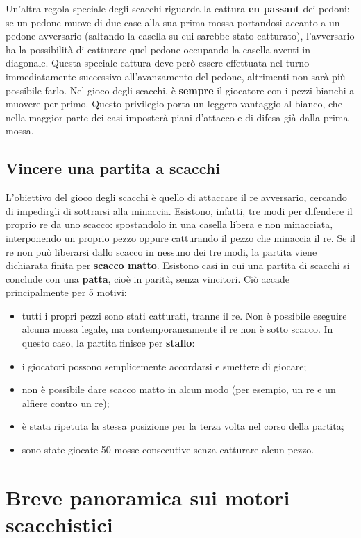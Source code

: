 Un'altra regola speciale degli scacchi riguarda la cattura \textbf{en passant} dei pedoni: se un pedone muove di due case alla sua prima mossa portandosi accanto a un pedone avversario (saltando la casella su cui sarebbe stato catturato), l'avversario ha la possibilità di catturare quel pedone occupando la casella aventi in diagonale. Questa speciale cattura deve però essere effettuata nel turno immediatamente successivo all'avanzamento del pedone, altrimenti non sarà più possibile farlo.
Nel gioco degli scacchi, è \textbf{sempre} il giocatore con i pezzi bianchi a muovere per primo. Questo privilegio porta un leggero vantaggio al bianco, che nella maggior parte dei casi imposterà piani d'attacco e di difesa già dalla prima mossa.

\subsection{Vincere una partita a scacchi}
L'obiettivo del gioco degli scacchi è quello di attaccare il re avversario, cercando di impedirgli di sottrarsi alla minaccia. Esistono, infatti, tre modi per difendere il proprio re da uno scacco: spostandolo in una casella libera e non minacciata, interponendo un proprio pezzo oppure catturando il pezzo che minaccia il re. Se il re non può liberarsi dallo scacco in nessuno dei tre modi, la partita viene dichiarata finita per \textbf{scacco matto}. Esistono casi in cui una partita di scacchi si conclude con una \textbf{patta}, cioè in parità, senza vincitori. Ciò accade principalmente per 5 motivi:
\begin{itemize}
    \item tutti i propri pezzi sono stati catturati, tranne il re. Non è possibile eseguire alcuna mossa legale, ma contemporaneamente il re non è sotto scacco. In questo caso, la partita finisce per \textbf{stallo}:
    \item i giocatori possono semplicemente accordarsi e smettere di giocare;
    \item non è possibile dare scacco matto in alcun modo (per esempio, un re e un alfiere contro un re);
    \item è stata ripetuta la stessa posizione per la terza volta nel corso della partita;
    \item sono state giocate 50 mosse consecutive senza catturare alcun pezzo.
\end{itemize}
\section{Breve panoramica sui motori scacchistici}
